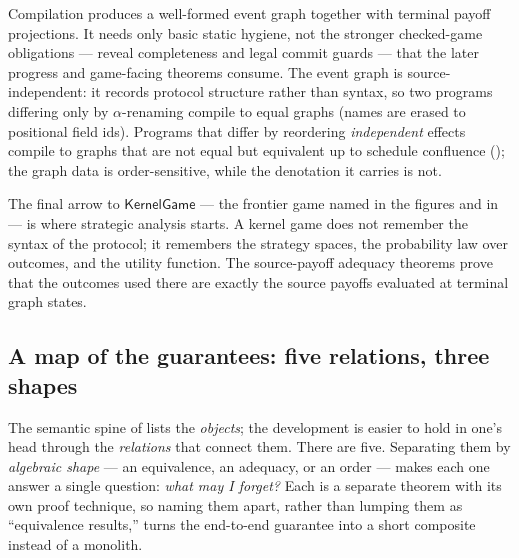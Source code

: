 Compilation produces a well-formed event graph together with terminal
payoff projections.  It needs only basic static hygiene, not the stronger
checked-game obligations --- reveal completeness and legal commit guards
--- that the later progress and game-facing theorems consume.  The event
graph is source-independent: it records protocol structure rather than
syntax, so two programs differing only by \(\alpha\)-renaming compile to
equal graphs (names are erased to positional field ids).  Programs that
differ by reordering \emph{independent} effects compile to graphs that are
not equal but equivalent up to schedule confluence
(); the graph data is order-sensitive, while the
denotation it carries is not.

The final arrow to \(\mathsf{KernelGame}\) --- the frontier game named in
the figures and in  --- is where strategic
analysis starts.  A kernel game does not remember the syntax of the protocol; it
remembers the strategy spaces, the probability law over outcomes, and
the utility function.  The source-payoff adequacy theorems prove that
the outcomes used there are exactly the source payoffs evaluated at
terminal graph states.

\subsection{A map of the guarantees: five relations, three shapes}
\label{sec:intro:relations}

The semantic spine of  lists the \emph{objects}; the
development is easier to hold in one's head through the \emph{relations} that
connect them.  There are five.  Separating them by \emph{algebraic shape}
--- an equivalence, an adequacy, or an order --- makes each one answer a
single question: \emph{what may I forget?}  Each is a separate theorem with
its own proof technique, so naming them apart, rather than lumping them as
``equivalence results,'' turns the end-to-end guarantee into a short
composite instead of a monolith.

